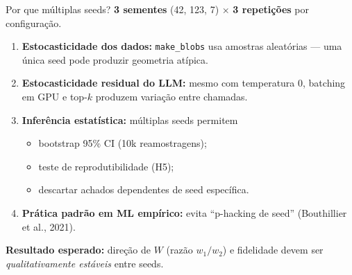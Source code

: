 \documentclass[aspectratio=169,10pt]{beamer}
\begin{document}
\begin{frame}{Por que m\'ultiplas seeds?}
  \footnotesize
  \textbf{3 sementes} (42, 123, 7) $\times$ \textbf{3 repeti\c{c}\~oes} por configura\c{c}\~ao.
  \medskip

  \begin{enumerate}
    \item \textbf{Estocasticidade dos dados:} \texttt{make\_blobs} usa amostras aleat\'orias --- uma \'unica seed pode produzir geometria at\'ipica.
    \item \textbf{Estocasticidade residual do LLM:} mesmo com temperatura $0$, batching em GPU e top-$k$ produzem varia\c{c}\~ao entre chamadas.
    \item \textbf{Inferência estat\'istica:} m\'ultiplas seeds permitem
      \begin{itemize}
        \item bootstrap 95\% CI (10k reamostragens);
        \item teste de reprodutibilidade (H5);
        \item descartar achados dependentes de seed espec\'ifica.
      \end{itemize}
    \item \textbf{Pr\'atica padr\~ao em ML emp\'irico:} evita ``p-hacking de seed'' (Bouthillier et al., 2021).
  \end{enumerate}
  \medskip

  \textbf{Resultado esperado:} dire\c{c}\~ao de $W$ (raz\~ao $w_1/w_2$) e fidelidade devem ser \emph{qualitativamente est\'aveis} entre seeds.
\end{frame}
\end{document}
